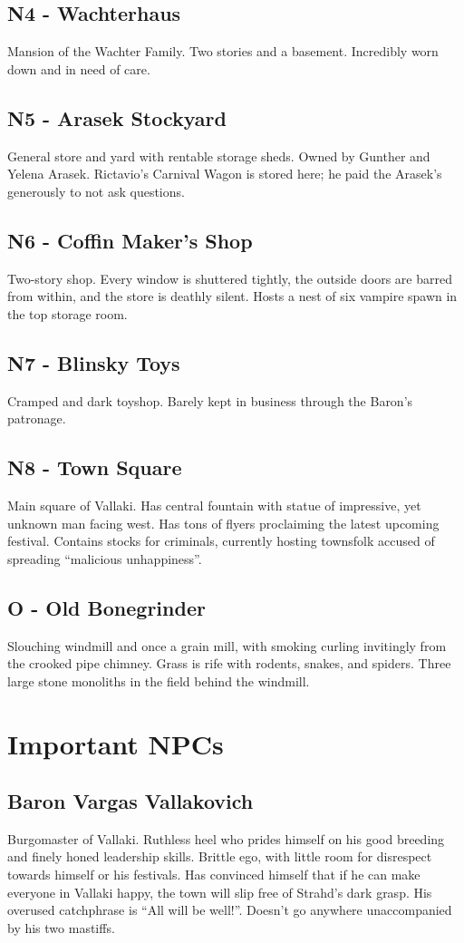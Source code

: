 \documentclass[a4paper,11pt]{article}
\begin{document}
\subsection{N4 - Wachterhaus}
  Mansion of the Wachter Family. Two stories and a basement. Incredibly worn down and in need of care.
\subsection{N5 - Arasek Stockyard}
  General store and yard with rentable storage sheds. Owned by Gunther and Yelena Arasek. Rictavio's Carnival 
  Wagon is stored here; he paid the Arasek's generously to not ask questions.
\subsection{N6 - Coffin Maker's Shop}
  Two-story shop. Every window is shuttered tightly, the outside doors are barred from within, and the store is 
  deathly silent. Hosts a nest of six vampire spawn in the top storage room.
\subsection{N7 - Blinsky Toys}
  Cramped and dark toyshop. Barely kept in business through the Baron's patronage.
\subsection{N8 - Town Square}
  Main square of Vallaki. Has central fountain with statue of impressive, yet unknown man facing west. Has tons 
  of flyers proclaiming the latest upcoming festival. Contains stocks for criminals, currently hosting townsfolk
  accused of spreading ``malicious unhappiness''.
\subsection{O - Old Bonegrinder}
  Slouching windmill and once a grain mill, with smoking curling invitingly from the crooked pipe chimney. Grass
  is rife with rodents, snakes, and spiders. Three large stone monoliths in the field behind the windmill.


\section{Important NPCs}
\label{sec:ImportantNPCs}
\subsection{Baron Vargas Vallakovich}
  Burgomaster of Vallaki. Ruthless heel who prides himself on his good breeding and finely honed leadership 
  skills. Brittle ego, with little room for disrespect towards himself or his festivals. Has convinced himself 
  that if he can make everyone in Vallaki happy, the town will slip free of Strahd's dark grasp. His overused 
  catchphrase is ``All will be well!''. Doesn't go anywhere unaccompanied by his two mastiffs.
\end{document}
